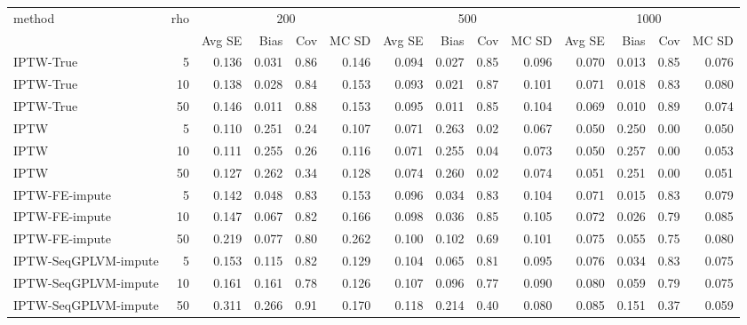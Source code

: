 \begin{tabular}{l r|rrrr|rrrr|rrrr}
\toprule
method & rho & \multicolumn{4}{c|}{200} & \multicolumn{4}{c|}{500} & \multicolumn{4}{c}{1000} \\
 &  & Avg SE & Bias & Cov & MC SD & Avg SE & Bias & Cov & MC SD & Avg SE & Bias & Cov & MC SD \\
\midrule
IPTW-True & 5 & 0.136 & 0.031 & 0.86 & 0.146 & 0.094 & 0.027 & 0.85 & 0.096 & 0.070 & 0.013 & 0.85 & 0.076 \\
IPTW-True & 10 & 0.138 & 0.028 & 0.84 & 0.153 & 0.093 & 0.021 & 0.87 & 0.101 & 0.071 & 0.018 & 0.83 & 0.080 \\
IPTW-True & 50 & 0.146 & 0.011 & 0.88 & 0.153 & 0.095 & 0.011 & 0.85 & 0.104 & 0.069 & 0.010 & 0.89 & 0.074 \\
IPTW & 5 & 0.110 & 0.251 & 0.24 & 0.107 & 0.071 & 0.263 & 0.02 & 0.067 & 0.050 & 0.250 & 0.00 & 0.050 \\
IPTW & 10 & 0.111 & 0.255 & 0.26 & 0.116 & 0.071 & 0.255 & 0.04 & 0.073 & 0.050 & 0.257 & 0.00 & 0.053 \\
IPTW & 50 & 0.127 & 0.262 & 0.34 & 0.128 & 0.074 & 0.260 & 0.02 & 0.074 & 0.051 & 0.251 & 0.00 & 0.051 \\
IPTW-FE-impute & 5 & 0.142 & 0.048 & 0.83 & 0.153 & 0.096 & 0.034 & 0.83 & 0.104 & 0.071 & 0.015 & 0.83 & 0.079 \\
IPTW-FE-impute & 10 & 0.147 & 0.067 & 0.82 & 0.166 & 0.098 & 0.036 & 0.85 & 0.105 & 0.072 & 0.026 & 0.79 & 0.085 \\
IPTW-FE-impute & 50 & 0.219 & 0.077 & 0.80 & 0.262 & 0.100 & 0.102 & 0.69 & 0.101 & 0.075 & 0.055 & 0.75 & 0.080 \\
IPTW-SeqGPLVM-impute & 5 & 0.153 & 0.115 & 0.82 & 0.129 & 0.104 & 0.065 & 0.81 & 0.095 & 0.076 & 0.034 & 0.83 & 0.075 \\
IPTW-SeqGPLVM-impute & 10 & 0.161 & 0.161 & 0.78 & 0.126 & 0.107 & 0.096 & 0.77 & 0.090 & 0.080 & 0.059 & 0.79 & 0.075 \\
IPTW-SeqGPLVM-impute & 50 & 0.311 & 0.266 & 0.91 & 0.170 & 0.118 & 0.214 & 0.40 & 0.080 & 0.085 & 0.151 & 0.37 & 0.059 \\
\bottomrule
\end{tabular}